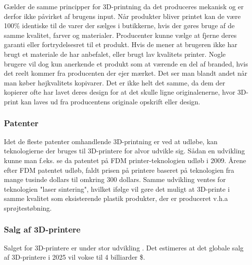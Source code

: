 Gælder de samme principper for 3D-printning da det produceres mekanisk og er derfor ikke påvirket af brugens input. Når produkter bliver printet kan de være 100\% identiske til de varer der sælges i butikkerne, hvis der gøres bruge af de samme kvalitet, farver og materialer.
Producenter kunne vælge at fjerne deres garanti eller fortrydelsesret til et produkt. Hvis de mener at brugeren ikke har brugt et materiale de har anbefalet, eller brugt lav kvalitets printer.
Nogle brugere vil dog kun anerkende et produkt som at værende en del af branded, hvis det reelt kommer fra producenten der ejer mærket. Det ser man blandt andet når man køber højkvalitets kopivarer.\autocite{_vi_????}
Det er ikke helt det samme, da dem der kopierer ofte har lavet deres design for at det skulle ligne originalenerne, hvor 3D-print kan laves ud fra producentens originale opskrift eller design.



\subsubsection{Patenter} %
\label{ssub:patenter}


Idet de fleste patenter omhandlende 3D-printning er ved at udløbe, kan teknologierne der bruges til 3D-printere for alvor udvikle sig. Sådan en udvikling kunne man f.eks. se da patentet på FDM printer-teknologien udløb i 2009. \autocite{manyika_disruptive_2013} Årene efter FDM patentet udløb, faldt prisen på printere baseret på teknologien fra mange tusinde dollars til omkring 300 dollars. \autocite{mims_3d_2013} Samme udvikling ventes for teknologien "laser sintering", hvilket ifølge \autocite{mims_3d_2013} vil gøre det muligt at 3D-printe i samme kvalitet som eksisterende plastik produkter, der er produceret v.h.a sprøjtestøbning.






\subsubsection{Salg af 3D-printere} %
\label{ssub:salg_af_3d_printere}


Salget for 3D-printere er under stor udvikling \autocite{wohler_sales_2012}. Det estimeres at det globale salg af 3D-printere i 2025 vil vokse til 4 billiarder \$. \autocite[110]{manyika_disruptive_2013}





